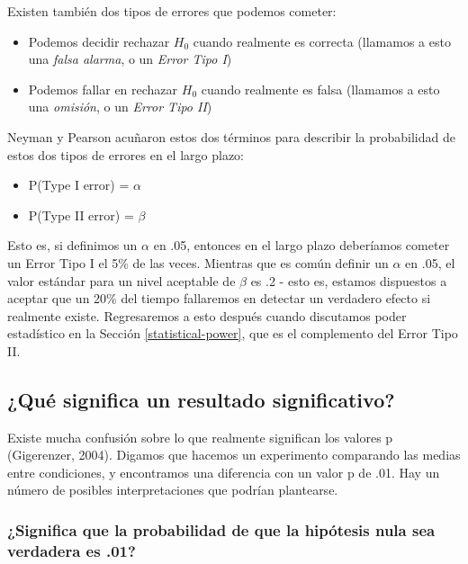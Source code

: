 \documentclass[
  12pt,
]{book}
\providecommand{\tightlist}{%
  \setlength{\itemsep}{0pt}\setlength{\parskip}{0pt}}
\theoremstyle{definition}
\theoremstyle{definition}
\theoremstyle{definition}
\theoremstyle{remark}
\begin{document}
Existen también dos tipos de errores que podemos cometer:

\begin{itemize}
\tightlist
\item
  Podemos decidir rechazar \(H_0\) cuando realmente es correcta (llamamos a esto una \emph{falsa alarma}, o un \emph{Error Tipo I})
\item
  Podemos fallar en rechazar \(H_0\) cuando realmente es falsa (llamamos a esto una \emph{omisión}, o un \emph{Error Tipo II})
\end{itemize}

Neyman y Pearson acuñaron estos dos términos para describir la probabilidad de estos dos tipos de errores en el largo plazo:

\begin{itemize}
\tightlist
\item
  P(Type I error) = \(\alpha\)
\item
  P(Type II error) = \(\beta\)
\end{itemize}

Esto es, si definimos un \(\alpha\) en .05, entonces en el largo plazo deberíamos cometer un Error Tipo I el 5\% de las veces. Mientras que es común definir un \(\alpha\) en .05, el valor estándar para un nivel aceptable de \(\beta\) es .2 - esto es, estamos dispuestos a aceptar que un 20\% del tiempo fallaremos en detectar un verdadero efecto si realmente existe. Regresaremos a esto después cuando discutamos poder estadístico en la Sección \ref{statistical-power}, que es el complemento del Error Tipo II.

\hypertarget{quuxe9-significa-un-resultado-significativo}{%
\subsection{¿Qué significa un resultado significativo?}\label{quuxe9-significa-un-resultado-significativo}}

Existe mucha confusión sobre lo que realmente significan los valores p (Gigerenzer, 2004). Digamos que hacemos un experimento comparando las medias entre condiciones, y encontramos una diferencia con un valor p de .01. Hay un número de posibles interpretaciones que podrían plantearse.

\hypertarget{significa-que-la-probabilidad-de-que-la-hipuxf3tesis-nula-sea-verdadera-es-.01}{%
\subsubsection{¿Significa que la probabilidad de que la hipótesis nula sea verdadera es .01?}\label{significa-que-la-probabilidad-de-que-la-hipuxf3tesis-nula-sea-verdadera-es-.01}}
\end{document}
